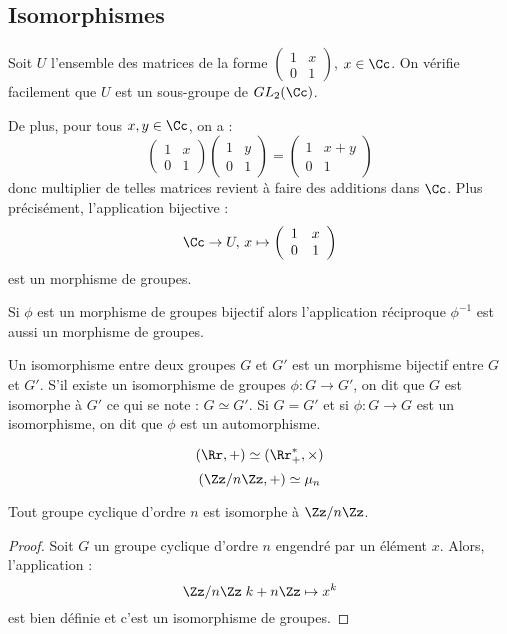 \documentclass[class=report,crop=false]{standalone}
\newcommand{\GL}{GL}
\newcommand{\iso}{\simeq}
\begin{document}
\subsection{Isomorphismes}

Soit $U$ l'ensemble des matrices de la forme $\left(\begin{array}{cc}
1 & x\\
0&1
\end{array}\right)$, $x \in \Cc$. On vérifie facilement que $U$ est un sous-groupe de $\GL_2(\Cc)$.

De plus, pour tous $x,y \in \Cc$, on a :
\[\left(\begin{array}{cc}
1 & x\\
0&1
\end{array}\right) \left(\begin{array}{cc}
1 & y\\
0&1
\end{array}\right)=\left(\begin{array}{cc}
1 & x+y\\
0&1
\end{array}\right)\]
donc multiplier de telles matrices revient à faire des additions dans $\Cc$. Plus précisément, l'application bijective :
\[\Cc \to U ,\, x \mapsto \left(\begin{array}{cc}
1 & x\\
0&1
\end{array}\right)\]
est un morphisme de groupes.
 
Si $\phi$ est un morphisme de groupes bijectif alors l'application réciproque $\phi^{-1}$ est aussi un morphisme de groupes.

\begin{definition}
Un isomorphisme entre deux groupes $G$ et  $G'$ est un morphisme bijectif entre $G$ et $G'$. S'il existe un isomorphisme de groupes $\phi : G \to G'$, on dit que $G$ est isomorphe à $G'$ ce qui se note : $G \iso G'$. Si $G=G'$ et si $\phi : G \to G$ est un isomorphisme, on dit que $\phi$ est un automorphisme.
\end{definition}

\begin{exercicecours}
\[(\Rr,+) \iso (\Rr_+^*,\times)\]
\[ (\Zz/n\Zz,+) \iso {\mathbf{\mu}_n}\]
\end{exercicecours}




\begin{proposition}
Tout groupe cyclique d'ordre $n$ est isomorphe à $\Zz/n\Zz$.
\end{proposition}
\begin{proof}
Soit $G$ un groupe cyclique d'ordre $n$ engendré par un élément $x$. Alors, l'application :
\[\Zz/n\Zz\; k +n\Zz \mapsto x^k\]
est bien définie et c'est un isomorphisme de groupes.
\end{proof}
\end{document}
